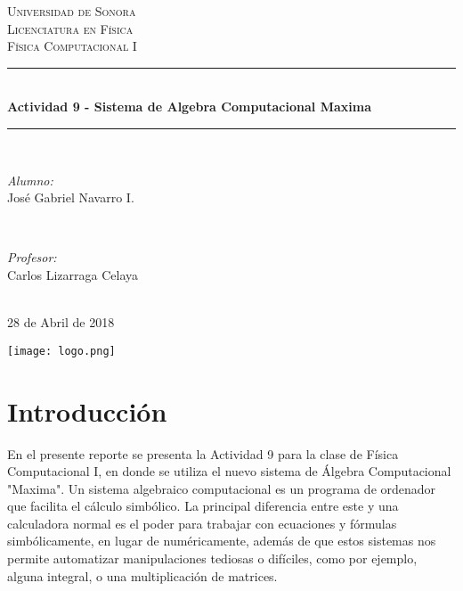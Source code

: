 \documentclass[12pt]{article}
\begin{document}
\begin{titlepage}

\newcommand{\HRule}{\rule{\linewidth}{0.5mm}} 

\center 

\textsc{\LARGE Universidad de Sonora}\\[1.5cm]
\textsc{\Large Licenciatura en Física}\\[0.5cm]
\textsc{\large Física Computacional I}\\[0.5cm]

\HRule \\[0.4cm]
{\huge \bfseries Actividad 9 - Sistema de Algebra Computacional Maxima}\\[0.4cm] 
\HRule \\[1.5cm]

\begin{minipage}{0.4\textwidth}
\begin{flushleft} \large
\emph{Alumno:}\\
José Gabriel Navarro I.
\end{flushleft}
\end{minipage}
~
\begin{minipage}{0.4\textwidth}
\begin{flushright} \large
\emph{Profesor:} \\
Carlos Lizarraga Celaya
\end{flushright}
\end{minipage}\\[2cm]

28 de Abril de 2018

\texttt{[image: logo.png]}\\
 
\vfill

\end{titlepage}

\section{Introducción}
En el presente reporte se presenta la Actividad 9 para la clase de Física Computacional I, en donde se utiliza el nuevo sistema de Álgebra Computacional "Maxima". Un sistema algebraico computacional es un programa de ordenador  que facilita el cálculo simbólico. La principal diferencia entre este y una calculadora normal es el poder para trabajar con ecuaciones y fórmulas simbólicamente, en lugar de numéricamente, además de que estos sistemas nos permite automatizar manipulaciones tediosas o difíciles, como por ejemplo, alguna integral, o una multiplicación de matrices. \\
\end{document}
